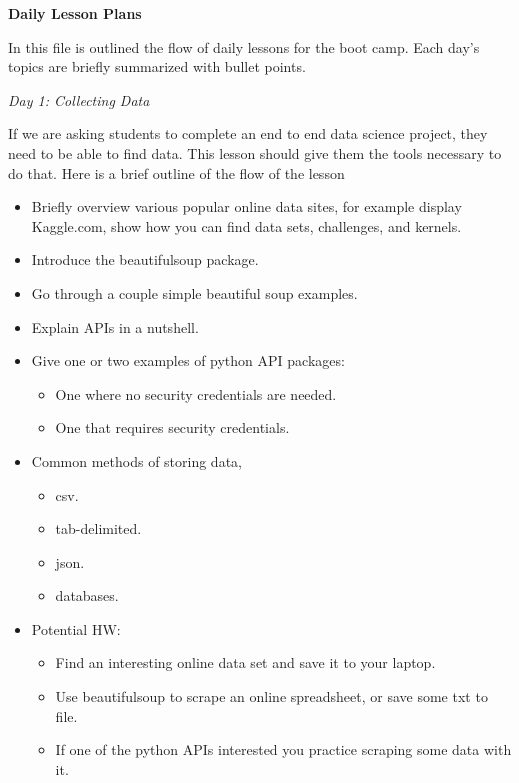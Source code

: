 \documentclass[12pt]{article}
\begin{document}
	\noindent
	\textbf{\Large{Daily Lesson Plans}}
	
	\vspace{4mm}
	\noindent
	In this file is outlined the flow of daily lessons for the boot camp. Each day's topics are briefly summarized with bullet points.
	
	
	\vspace{4mm}
	\noindent
	\textit{\large{Day 1: Collecting Data}}
	
	\noindent
	If we are asking students to complete an end to end data science project, they need to be able to find data. This lesson should give them the tools necessary to do that. Here is a brief outline of the flow of the lesson
	\begin{itemize}
		\item Briefly overview various popular online data sites, for example display Kaggle.com, show how you can find data sets, challenges, and kernels.
		\item Introduce the beautifulsoup package.
		\item Go through a couple simple beautiful soup examples.
		\item Explain APIs in a nutshell.
		\item Give one or two examples of python API packages:
			\begin{itemize}
				\item One where no security credentials are needed.
				\item One that requires security credentials.
			\end{itemize}
		\item Common methods of storing data,
			\begin{itemize}
				\item csv.
				\item tab-delimited.
				\item json.
				\item databases.
			\end{itemize}
		\item Potential HW:
			\begin{itemize}
				\item Find an interesting online data set and save it to your laptop.
				\item Use beautifulsoup to scrape an online spreadsheet, or save some txt to file.
				\item If one of the python APIs interested you practice scraping some data with it.
			\end{itemize}
	\end{itemize}
	
\end{document}
